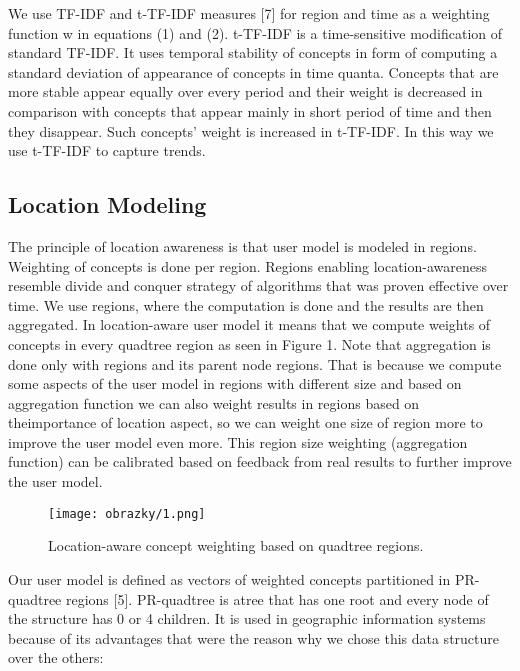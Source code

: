 \documentclass[a4, conference]{IEEEtran}
\begin{document}
We  use  TF-IDF  and  t-TF-IDF  measures  [7]  for  region and time as a weighting function w in equations (1) and (2). t-TF-IDF  is  a  time-sensitive  modification  of  standard  TF-IDF.   It   uses   temporal   stability   of   concepts   in   form   of computing a standard deviation of appearance of concepts in time  quanta.  Concepts  that  are  more  stable  appear  equally over  every   period   and   their   weight   is   decreased   in comparison with concepts that appear mainly in short period of  time  and  then  they  disappear.  Such  concepts’  weight  is increased  in  t-TF-IDF.  In  this  way  we  use  t-TF-IDF to capture trends.  

\subsection{Location Modeling}

The principle of  location  awareness is that  user  model  is modeled  in  regions.  Weighting  of  concepts  is  done  per region. Regions enabling location-awareness resemble divide and conquer strategy of algorithms that was proven effective over  time.  We  use  regions,  where  the  computation  is  done and  the  results  are  then  aggregated.  In  location-aware  user model  it  means  that  we  compute  weights  of  concepts in every   quadtree   region   as   seen   in   Figure   1.   Note   that aggregation  is  done  only  with  regions  and  its  parent  node regions.  That  is  because  we  compute  some  aspects  of  the user  model  in  regions  with  different  size  and  based  on aggregation  function  we  can  also  weight  results  in regions based on theimportance of location aspect, so we can weight one  size  of  region  more  to  improve  the  user  model  even more.  This  region  size  weighting  (aggregation  function)  can be  calibrated  based  on  feedback  from  real  results  to  further improve the user model.

\begin{figure}[h!]
\texttt{[image: obrazky/1.png]}
\caption{Location-aware concept weighting based on quadtree regions.}
\end{figure}

 Our user model is defined as vectors of weighted concepts partitioned in PR-quadtree regions [5]. PR-quadtree is atree that has one root and every node of the structure has 0 or 4 children. It is used in geographic information systems because of its advantages that were the reason why we chose this data structure over the others:~\cite{Carmagnola2007}
\end{document}
